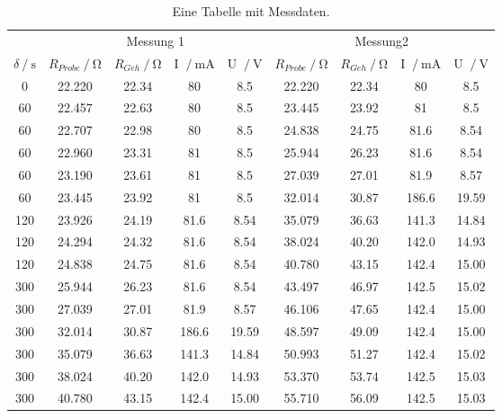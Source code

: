 \begin{table}
    \centering
    \caption{Eine Tabelle mit Messdaten.}
    \label{tab:some_data}
    \begin{tabular}{c c c c c c c c c}
      \toprule
      & \multicolumn{4}{c}{Messung 1} & \multicolumn{4}{c}{Messung2} \\
      \cmidrule(lr){2-5}\cmidrule(lr){6-9}
      {$\delta \:/\: \si{\second}$}
      & {$R_{Probe} \:/\: \si{\ohm}$}
      & {$R_{Geh} \:/\: \si{\ohm}$}
      & {I $\:/\: \si{\milli\ampere}$}
      & {U $\:/\: \si{\volt}$}
      & {$R_{Probe} \:/\: \si{\ohm}$}
      & {$R_{Geh} \:/\: \si{\ohm}$}
      & {I $\:/\: \si{\milli\ampere}$}
      & {U $\:/\: \si{\volt}$} \\
      \midrule

      0  &  22.220  &  22.34 &  80   &  8.5   &  22.220  &  22.34 &  80   &  8.5  \\
     60  &  22.457  &  22.63 &  80   &  8.5   &  23.445  &  23.92 &  81   &  8.5  \\
     60  &  22.707  &  22.98 &  80   &  8.5   &  24.838  &  24.75 &  81.6 &  8.54 \\
     60  &  22.960  &  23.31 &  81   &  8.5   &  25.944  &  26.23 &  81.6 &  8.54 \\
     60  &  23.190  &  23.61 &  81   &  8.5   &  27.039  &  27.01 &  81.9 &  8.57 \\
     60  &  23.445  &  23.92 &  81   &  8.5   &  32.014  &  30.87 & 186.6 & 19.59 \\
    120  &  23.926  &  24.19 &  81.6 &  8.54  &  35.079  &  36.63 & 141.3 & 14.84 \\
    120  &  24.294  &  24.32 &  81.6 &  8.54  &  38.024  &  40.20 & 142.0 & 14.93 \\
    120  &  24.838  &  24.75 &  81.6 &  8.54  &  40.780  &  43.15 & 142.4 & 15.00 \\
    300  &  25.944  &  26.23 &  81.6 &  8.54  &  43.497  &  46.97 & 142.5 & 15.02 \\
    300  &  27.039  &  27.01 &  81.9 &  8.57  &  46.106  &  47.65 & 142.4 & 15.00 \\
    300  &  32.014  &  30.87 & 186.6 & 19.59  &  48.597  &  49.09 & 142.4 & 15.00 \\
    300  &  35.079  &  36.63 & 141.3 & 14.84  &  50.993  &  51.27 & 142.4 & 15.02 \\
    300  &  38.024  &  40.20 & 142.0 & 14.93  &  53.370  &  53.74 & 142.5 & 15.03 \\
    300  &  40.780  &  43.15 & 142.4 & 15.00  &  55.710  &  56.09 & 142.5 & 15.03 \\

\end{tabular}
\end{table}
